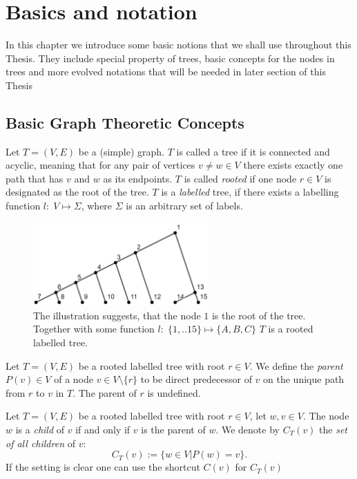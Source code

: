 \chapter{Basics and notation} 
In this chapter we introduce some basic notions that we shall use throughout this
Thesis. They include special property of trees, basic concepts for the nodes in trees and more evolved notations that will be needed in later section of this Thesis 
\section{Basic Graph Theoretic Concepts}
\begin{defin}
Let $T=(V,E)$ be a (simple) graph. $T$ is called a tree if it is connected and acyclic, meaning that for any pair of vertices $v \neq w \in V$ there exists exactly one path that has $v$ and $w$ as its endpoints. $T$ is called \textit{rooted} if one node $r \in V$ is designated as the root of the tree. $T$ is a \textit{labelled} tree, if there exists a labelling function $l:\;V\mapsto \Sigma$, where $\Sigma$ is an arbitrary set of labels.
\end{defin}
\begin{figure}[h!]
	\centering
    \includegraphics[width=0.6\textwidth]{figures/rooted_tree.jpg}
    \captionsetup{singlelinecheck=off}
    \caption{The illustration suggests, that the node $1$ is the root of the tree. Together with some function $l:\;\{1,..15\} \mapsto \{A,B,C\}$ $T$ is a rooted labelled tree.} \end{figure}
\begin{defin}
Let $T=(V,E)$ be a rooted labelled tree with root $r\in V$. We define the \textit{parent} $P(v) \in V$ of a node $v\in V\setminus \{r\}$ to be direct predecessor of $v$ on the unique path from $r$ to $v$ in $T$. The parent of $r$ is undefined. 
\end{defin}
\begin{defin}
Let $T=(V,E)$ be a rooted labelled tree with root $r\in V$, let $w,v \in V$. The node $w$ is a \textit{child} of $v$ if and only if $v$ is the parent of $w$. We denote by $C_T(v)$ the \textit{set of all children} of $v$:
$$ C_T(v):= \{w \in V | P(w) = v\}.$$
If the setting is clear one can use the shortcut $C(v)$ for $C_T(v)$
\end{defin}
